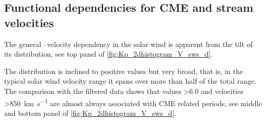 \subsection{Functional dependencies for CME and stream velocities}
The general \Kp--velocity dependency in the solar wind is apparent from the tilt of its distribution, see top panel of \autoref{fig:Kp_2dhistogram_V_sws_d}.
\begin{figure}
\end{figure}
The distribution is inclined to positive values but very broad, that is, in the typical solar wind velocity range it spans over more than half of the total \Kp{} range. The comparison with the filtered data shows that \Kp{} values \num{>6.0} and velocities \SI{>850}{\km\per\s} are almost always associated with CME related periods, see middle and bottom panel of \autoref{fig:Kp_2dhistogram_V_sws_d}.

